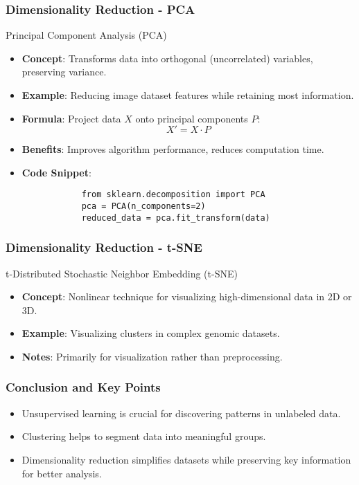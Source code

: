 \documentclass[aspectratio=169]{beamer}
\begin{document}
\begin{frame}[fragile]
    \frametitle{Dimensionality Reduction - PCA}
    \begin{block}{Principal Component Analysis (PCA)}
        \begin{itemize}
            \item \textbf{Concept}: Transforms data into orthogonal (uncorrelated) variables, preserving variance.
            \item \textbf{Example}: Reducing image dataset features while retaining most information.
            \item \textbf{Formula}: Project data \( X \) onto principal components \( P \):
            \begin{equation}
                X' = X \cdot P
            \end{equation}
            \item \textbf{Benefits}: Improves algorithm performance, reduces computation time.
            \item \textbf{Code Snippet}:
            \begin{lstlisting}
            from sklearn.decomposition import PCA
            pca = PCA(n_components=2)
            reduced_data = pca.fit_transform(data)
            \end{lstlisting}
        \end{itemize}
    \end{block}
\end{frame}

\begin{frame}
    \frametitle{Dimensionality Reduction - t-SNE}
    \begin{block}{t-Distributed Stochastic Neighbor Embedding (t-SNE)}
        \begin{itemize}
            \item \textbf{Concept}: Nonlinear technique for visualizing high-dimensional data in 2D or 3D.
            \item \textbf{Example}: Visualizing clusters in complex genomic datasets.
            \item \textbf{Notes}: Primarily for visualization rather than preprocessing.
        \end{itemize}
    \end{block}
\end{frame}

\begin{frame}
    \frametitle{Conclusion and Key Points}
    \begin{itemize}
        \item Unsupervised learning is crucial for discovering patterns in unlabeled data.
        \item Clustering helps to segment data into meaningful groups.
        \item Dimensionality reduction simplifies datasets while preserving key information for better analysis.
    \end{itemize}
\end{frame}
\end{document}
